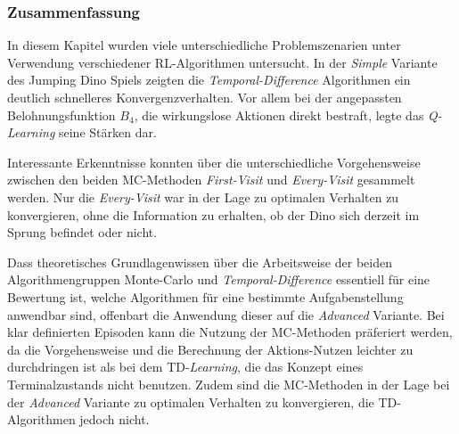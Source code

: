 \subsubsection{Zusammenfassung}
In diesem Kapitel wurden viele unterschiedliche Problemszenarien unter Verwendung verschiedener RL-Algorithmen untersucht. In der \textit{Simple} Variante des Jumping Dino Spiels zeigten die \textit{Temporal-Difference} Algorithmen ein deutlich schnelleres Konvergenzverhalten. Vor allem bei der angepassten Belohnungsfunktion $B_4$, die wirkungslose Aktionen direkt bestraft, legte das \textit{Q-Learning} seine Stärken dar.
\par 
Interessante Erkenntnisse konnten über die unterschiedliche Vorgehensweise zwischen den beiden MC-Methoden \textit{First-Visit} und \textit{Every-Visit} gesammelt werden. Nur die \textit{Every-Visit} war in der Lage zu optimalen Verhalten zu konvergieren, ohne die Information zu erhalten, ob der Dino sich derzeit im Sprung befindet oder nicht.
\par 
Dass theoretisches Grundlagenwissen über die Arbeitsweise der beiden Algorithmengruppen Monte-Carlo und \textit{Temporal-Difference} essentiell für eine Bewertung ist, welche Algorithmen für eine bestimmte Aufgabenstellung anwendbar sind, offenbart die Anwendung dieser auf die \textit{Advanced} Variante. Bei klar definierten Episoden kann die Nutzung der MC-Methoden präferiert werden, da die Vorgehensweise und die Berechnung der Aktions-Nutzen leichter zu durchdringen ist als bei dem TD-\textit{Learning}, die das Konzept eines Terminalzustands nicht benutzen. Zudem sind die MC-Methoden in der Lage bei der \textit{Advanced} Variante zu optimalen Verhalten zu konvergieren, die TD-Algorithmen jedoch nicht. 